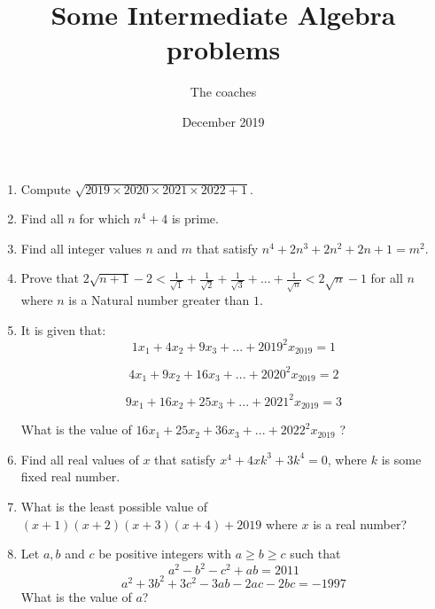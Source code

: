 \documentclass[a4paper,12pt]{article}
\begin{document}
\title {Some Intermediate Algebra problems}
\author{The coaches}
\date{December 2019}
\maketitle

\begin{enumerate}
\item %
Compute $\sqrt{2019 \times 2020 \times 2021 \times 2022 + 1}$. 

\item %
Find all $n$ for which $n^4 + 4$ is prime.

\item %
Find all integer values $n$ and $m$ that satisfy $n^4 + 2n^3 + 2n^2 + 2n + 1 = m^2$. 

\item %
Prove that $2\sqrt{n + 1} - 2 < \frac{1}{\sqrt{1}} + \frac{1}{\sqrt{2}} + \frac{1}{\sqrt{3}} + ... + \frac{1}{\sqrt{n}} < 2\sqrt{n} - 1$ for all $n$ where $n$ is a Natural number greater than $1$.

\item %
It is given that:
$$1x_1 + 4x_2 + 9x_3 + ... + 2019^2x_{2019} = 1$$

$$4x_1 + 9x_2 + 16x_3 + ... + 2020^2x_{2019} = 2$$

$$9x_1 + 16x_2 + 25x_3 + ... + 2021^2x_{2019} = 3$$

What is the value of $16x_1 + 25x_2 + 36x_3 + ... + 2022^2x_{2019}$ ?


\item %
Find all real values of $x$ that satisfy $x^4 + 4xk^3 + 3k^4 = 0$, where $k$ is some fixed real number.


\item %
What is the least possible value of $(x + 1)(x + 2)(x + 3)(x + 4) + 2019$ where $x$ is a real number?

\item %
Let $a, b$ and $c$ be positive integers with $a \ge b \ge c$ such that
$$a^2 - b^2 - c^2 + ab = 2011$$
$$a^2 + 3b^2 + 3c^2 - 3ab - 2ac - 2bc = -1997$$
What is the value of $a$?

\end{enumerate}
\end{document}
